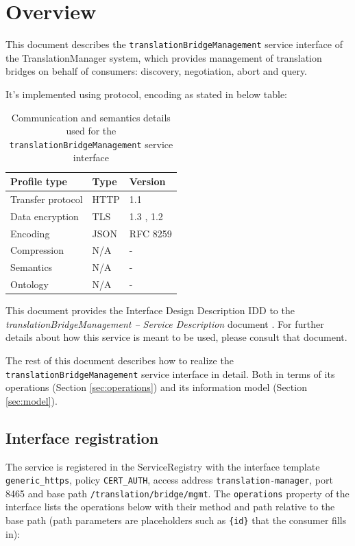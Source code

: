 \documentclass[a4paper]{arrowhead}
\begin{document}
\section{Overview}
\label{sec:overview}

This document describes the \texttt{translation\allowbreak{}Bridge\allowbreak{}Management} service interface of the TranslationManager system, which provides management of translation bridges on behalf of consumers: discovery, negotiation, abort and query.

It's implemented using protocol, encoding as stated in below table:
\begin{table}[ht!]
  \centering
  \begin{tabular}{|l|l|l|}
    \hline
    \rowcolor{gray!33} Profile type & Type & Version \\ \hline
    Transfer protocol & HTTP & 1.1 \cite{rfc9112} \\ \hline
    Data encryption & TLS & 1.3 \cite{rfc8446}, 1.2 \cite{rfc5246} \\ \hline
    Encoding & JSON & RFC 8259 \cite{rfc8259} \\ \hline
    Compression & N/A & - \\ \hline
    Semantics & N/A & - \\ \hline
    Ontology & N/A & - \\ \hline
  \end{tabular}
  \caption{Communication and semantics details used for the \texttt{translation\allowbreak{}Bridge\allowbreak{}Management} service interface}
  \label{tab:comunication_semantics_profile}
\end{table}

This document provides the Interface Design Description IDD to the \textit{translationBridgeManagement -- Service Description} document \cite{tm-translationBridgeManagement-sd}.
For further details about how this service is meant to be used, please consult that document.

The rest of this document describes how to realize the \texttt{translation\allowbreak{}Bridge\allowbreak{}Management} service
interface in detail. Both in terms of its operations (Section \ref{sec:operations}) and its information model (Section \ref{sec:model}).

\subsection{Interface registration}

The service is registered in the ServiceRegistry with the interface template \texttt{generic\_\allowbreak{}https}, policy \texttt{CERT\_\allowbreak{}AUTH}, access address \texttt{translation-\allowbreak{}manager}, port 8465 and base path \texttt{/\allowbreak{}translation/\allowbreak{}bridge/\allowbreak{}mgmt}. The \texttt{operations} property of the interface lists the operations below with their method and path relative to the base path (path parameters are placeholders such as \texttt{\{id\}} that the consumer fills in):
\end{document}

